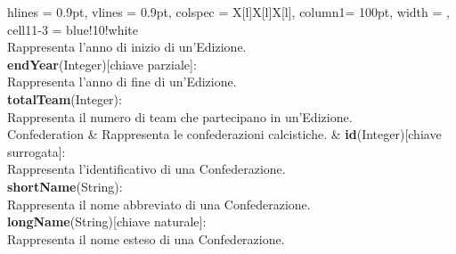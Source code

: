 \begin{tblr}{
    hlines = {0.9pt}, vlines = {0.9pt}, colspec = {X[l]X[l]X[l]}, column{1}= {100pt},
    width = \textwidth, cell{1}{1-3} = {blue!10!white}
}
{			\\Rappresenta l'anno di inizio di un'Edizione.\\
		\medskip\textbf{endYear}(Integer)[chiave parziale]:
			\\Rappresenta l'anno di fine di un'Edizione.\\
		\medskip\textbf{totalTeam}(Integer):\\Rappresenta
			il numero di team che partecipano in un'Edizione.
	}
	\\
	{
		Confederation
	}
	&
	{
	Rappresenta le confederazioni calcistiche.
	}
	& 
	{
		\textbf{id}(Integer)[chiave surrogata]:\\Rappresenta
			l'identificativo di una Confederazione.\\
		\medskip\textbf{shortName}(String):\\Rappresenta
			il nome abbreviato di una Confederazione.\\
		\medskip\textbf{longName}(String)[chiave naturale]:
			\\Rappresenta il nome esteso di una Confederazione.
	}
	\\
\end{tblr}

\newpage

